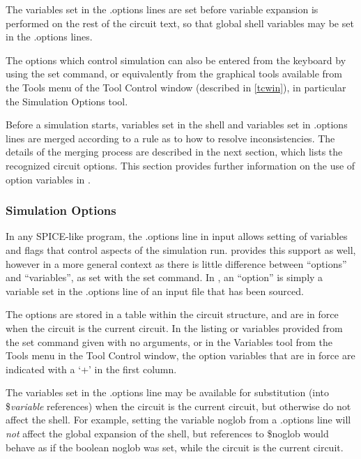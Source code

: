 The variables set in the {\vt .options} lines are set before variable
expansion is performed on the rest of the circuit text, so that global
shell variables may be set in the {\vt .options} lines.

The options which control simulation can also be entered from the
keyboard by using the {\WRspice} {\cb set} command, or equivalently
from the graphical tools available from the {\cb Tools} menu of the
{\cb Tool Control} window (described in \ref{tcwin}), in particular
the {\cb Simulation Options} tool.

Before a simulation starts, variables set in the shell and variables
set in {\vt .options} lines are merged according to a rule as to how
to resolve inconsistencies.  The details of the merging process are
described in the next section, which lists the recognized circuit
options.  This section provides further information on the use of
option variables in {\WRspice}.


\subsubsection{Simulation Options}
\label{options}

In any SPICE-like program, the {\vt .options} line in input allows
setting of variables and flags that control aspects of the simulation
run.  {\WRspice} provides this support as well, however in a more
general context as there is little difference between ``options'' and
``variables'', as set with the {\cb set} command.  In {\WRspice}, an
``option'' is simply a variable set in the {\vt .options} line of an
input file that has been sourced.

The options are stored in a table within the circuit structure, and
are in force when the circuit is the current circuit.  In the listing
or variables provided from the {\cb set} command given with no
arguments, or in the {\cb Variables} tool from the {\cb Tools} menu in
the {\cb Tool Control} window, the option variables that are in force
are indicated with a `{\vt +}' in the first column.

The variables set in the {\vt .options} line may be available for
substitution (into {\vt \$}{\it variable} references) when the circuit
is the current circuit, but otherwise do not affect the shell.  For
example, setting the variable {\vt noglob} from a {\vt .options} line
will {\it not} affect the global expansion of the shell, but
references to {\vt \$noglob} would behave as if the boolean {\vt
noglob} was set, while the circuit is the current circuit.

